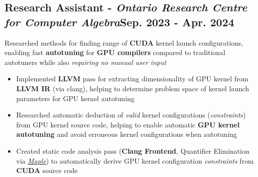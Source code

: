 \documentclass[9pt]{article}
\begin{document}
\subsection{Research Assistant - \textit{Ontario Research Centre for Computer Algebra}\hfill \normalsize\textnormal{Sep. 2023 - Apr. 2024}} %
Researched methods for finding range of \textbf{CUDA} kernel launch configurations, enabling fast \textbf{autotuning} for \textbf{GPU compilers} compared to traditional autotuners while also \textit{requiring no manual user input}
\vspace{-0.5em}
\begin{itemize}
  \item Implemented \textbf{LLVM} pass for extracting dimensionality of GPU kernel from \textbf{LLVM IR} (via clang), helping to determine problem space of kernel launch parameters for GPU kernel autotuning
  \item Researched automatic deduction of \textit{valid} kernel configurations (\textit{constraints}) from GPU kernel source code, helping to enable automatic \textbf{GPU kernel autotuning} and avoid erroneous kernel configurations when autotuning
  \item Created static code analysis pass (\textbf{Clang Frontend}, Quantifier Elimination via \href{https://maplesoft.com}{\textit{Maple}}) to automatically derive GPU kernel configuration \textit{constraints} from \textbf{CUDA} source code
\end{itemize}
\vspace{-1em}


\end{document}
